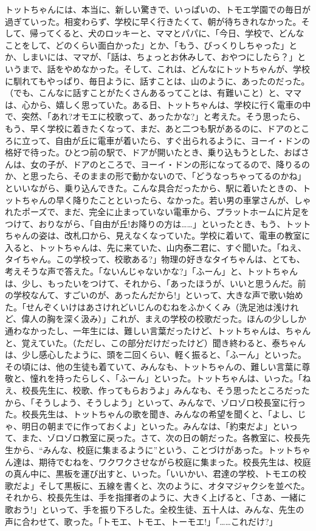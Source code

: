 \documentclass[12pt,a4paper,oneside,openany]{book}
\begin{document}
\tableofcontents

トットちゃんには、本当に、新しい驚きで、いっぱいの、トモエ学園での毎日が過ぎていった。相変わらず、学校に早く行きたくて、朝が待ちきれなかった。そして、帰ってくると、犬のロッキーと、ママとパパに、「今日、学校で、どんなことをして、どのくらい面白かった」とか、「もう、びっくりしちゃった」とか、しまいには、ママが、「話は、ちょっとお休みして、おやつにしたら？」というまで、話をやめなかった。そして、これは、どんなにトットちゃんが、学校に馴れてもやっぱり、毎日ように、話すことは、山のように、あったのだった。（でも、こんなに話すことがたくさんあるってことは、有難いこと）と、ママは、心から、嬉しく思っていた。ある日、トットちゃんは、学校に行く電車の中で、突然、「あれ?オモエに校歌って、あったかな?」と考えた。そう思ったら、もう、早く学校に着きたくなって、まだ、あと二つも駅があるのに、ドアのところに立って、自由が丘に電車が着いたら、すぐ出られるように、ヨーイ・ドンの格好で待った。ひとつ前の駅で、ドアが開いたとき、乗り込もうとした、おばさんは、女の子が、ドアのところで、ヨーイ・ドンの形になってるので、降りるのか、と思ったら、そのままの形で動かないので、「どうなっちゃってるのかね」といいながら、乗り込んできた。こんな具合だったから、駅に着いたときの、トットちゃんの早く降りたことといったら、なかった。若い男の車掌さんが、しゃれたポーズで、まだ、完全に止まっていない電車から、プラットホームに片足をつけて、おりながら、「自由が丘!お降りの方は……」といったとき、もう、トットちゃんの姿は、改札口から、見えなくなっていた。学校に着いて、電車の教室に入ると、トットちゃんは、先に来ていた、山内泰二君に、すぐ聞いた。「ねえ、タイちゃん。この学校って、校歌ある?」物理の好きなタイちゃんは、とても、考えそうな声で答えた。「ないんじゃないかな?」「ふーん」と、トットちゃんは、少し、もったいをつけて、それから、「あったほうが、いいと思うんだ。前の学校なんて、すごいのが、あったんだから!」といって、大きな声で歌い始めた。「せんぞくいけはあさけれどいじんのむねをふかくくみ（洗足池は浅けれど、偉人の胸を深く汲み）」これが、まえの学校の校歌だった。ほんの少ししか通わなかったし、一年生には、難しい言葉だったけど、トットちゃんは、ちゃんと、覚えていた。（ただし、この部分だけだったけど）聞き終わると、泰ちゃんは、少し感心したように、頭を二回くらい、軽く振ると、「ふーん」といった。その頃には、他の生徒も着ていて、みんなも、トットちゃんの、難しい言葉に尊敬と、憧れを持ったらしく、「ふーん」といった。トットちゃんは、いった。「ねえ、校長先生に、校歌、作ってもらおうよ」みんなも、そう思ったところだったから、「そうしよう、そうしよう」といって、みんなで、ゾロゾロ校長室に行った。校長先生は、トットちゃんの歌を聞き、みんなの希望を聞くと、「よし、じゃ、明日の朝までに作っておくよ」といった。みんなは、「約束だよ」といって、また、ゾロゾロ教室に戻った。さて、次の日の朝だった。各教室に、校長先生から、“みんな、校庭に集まるように”という、ことづけがあった。トットちゃん達は、期待でむねを、ワクワクさせながら校庭に集まった。校長先生は、校庭の真ん中に、黒板を運び出すと、いった。「いいかい、君達の学校、トモエの校歌だよ」そして黒板に、五線を書くと、次のように、オタマジャクシを並べた。それから、校長先生は、手を指揮者のように、大きく上げると、「さあ、一緒に歌おう!」といって、手を振り下ろした。全校生徒、五十人は、みんな、先生の声に合わせて、歌った。「トモエ、トモエ、トーモエ!」「……これだけ?」
\end{document}
